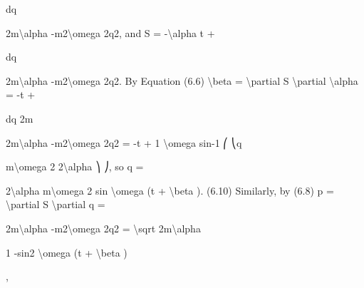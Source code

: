 dq

2m\textbackslash{}alpha  -m2\textbackslash{}omega 2q2,
and
S = -\textbackslash{}alpha t +

dq

2m\textbackslash{}alpha  -m2\textbackslash{}omega 2q2.
By Equation (6.6)
\textbackslash{}beta  = \textbackslash{}partial S
\textbackslash{}partial \textbackslash{}alpha  = -t +

dq
2m

2m\textbackslash{}alpha  -m2\textbackslash{}omega 2q2 = -t + 1
\textbackslash{}omega  sin-1
⎛
⎝q

m\textbackslash{}omega 2
2\textbackslash{}alpha
⎞
⎠,
so
q =

2\textbackslash{}alpha
m\textbackslash{}omega 2 sin \textbackslash{}omega (t + \textbackslash{}beta ).
(6.10)
Similarly, by (6.8)
p = \textbackslash{}partial S
\textbackslash{}partial q =

2m\textbackslash{}alpha  -m2\textbackslash{}omega 2q2 =
\textbackslash{}sqrt
2m\textbackslash{}alpha

1 -sin2 \textbackslash{}omega (t + \textbackslash{}beta )

,

